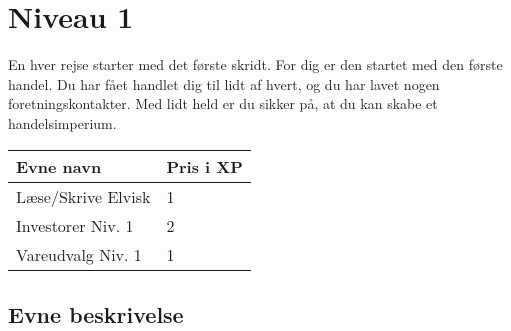 \chapter*{Niveau 1}
En hver rejse starter med det første skridt. For dig er den startet med den første handel. Du har fået handlet dig til lidt af hvert, og du har lavet nogen foretningskontakter. Med lidt held er du sikker på, at du kan skabe et handelsimperium.

\begin{table}[H]
    \centering
    \begin{tabular}{|p{}|p{}|}
    \rowcolor{cerulean!80}\hline
        Evne navn & Pris i XP \\\hline
         Læse/Skrive Elvisk & 1\\\hline
         Investorer Niv. 1 & 2 \\\hline
         Vareudvalg Niv. 1 & 1 \\\hline
    \end{tabular}
\end{table}

\section*{Evne beskrivelse}





